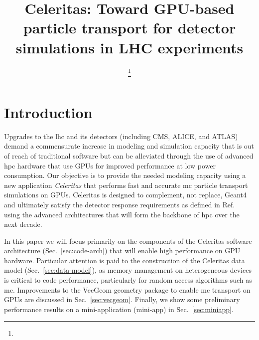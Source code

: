 \documentclass{webofc}
\begin{document}
\title{Celeritas: Toward GPU-based particle transport for detector simulations
    in LHC experiments}
\author{
     \fnsep
    \thanks{}
    \and
     
    \and
     
    \and
     
    \and
     
    \and
     
    \and
     
    \and
     
}



\maketitle

\section{Introduction}
\label{sec:introduction}

Upgrades to the \ac{lhc} and its detectors (including CMS, ALICE, and ATLAS)
demand a commensurate increase in modeling and simulation capacity that is out
of reach of traditional software but can be alleviated through the use of
advanced \ac{hpc} hardware that use GPUs for improved performance at low power
consumption.  Our objective is to provide the needed modeling capacity using a
new application \emph{Celeritas} that performs fast and accurate \ac{mc}
particle transport simulations on GPUs. Celeritas is designed to complement, not
replace, Geant4 and ultimately satisfy the detector response requirements as
defined in Ref.~\cite{the_hep_software_foundation_roadmap_2019} using  the
advanced architectures that will form the backbone of \ac{hpc} over the next
decade.


In this paper we will focus primarily on the components of the Celeritas
software architecture (Sec.~\ref{sec:code-arch}) that will enable high
performance on GPU hardware.  Particular attention is paid to the construction
of the Celeritas data model (Sec.~\ref{sec:data-model}), as memory management on
heterogeneous devices is critical to code performance, particularly for random
access algorithms such as \ac{mc}.  Improvements to the VecGeom geometry package to enable \ac{mc} transport on GPUs are discussed in Sec.~\ref{sec:vecgeom}.  Finally, we show some preliminary performance results on a mini-application (mini-app) in Sec.~\ref{sec:miniapp}.
\end{document}
